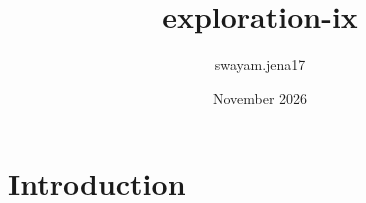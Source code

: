 \documentclass{book}
\title{exploration-ix}
\author{swayam.jena17 }
\date{November 2026}
\begin{document}
\maketitle

\section{Introduction}
\end{document}
